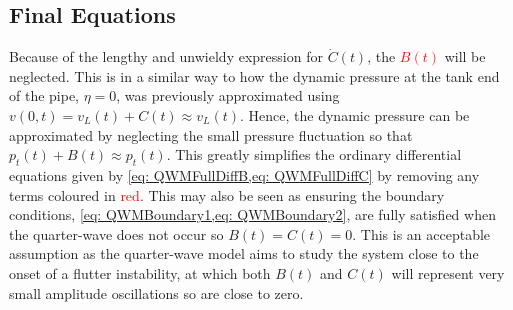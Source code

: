 


%

\subsection{Final Equations} \label{sec: QWMFinalDimensional}


Because of the lengthy and unwieldy expression for $\dot{C}(t)$, the \textcolor{Red}{$B(t)$} will be neglected. This is in a similar way to how the dynamic pressure at the tank end of the pipe, $\eta = 0$, was previously approximated using $v(0,t) = v_L(t) + C(t) \approx v_L(t)$. Hence, the dynamic pressure can be approximated by neglecting the small pressure fluctuation so that $p_t(t) + B(t) \approx p_t(t)$. This greatly simplifies the ordinary differential equations given by \cref{eq: QWMFullDiffB,eq: QWMFullDiffC} by removing any terms coloured in \textcolor{Red}{red}. This may also be seen as ensuring the boundary conditions, \cref{eq: QWMBoundary1,eq: QWMBoundary2}, are fully satisfied when the quarter-wave does not occur so $B(t) = C(t) = 0$. This is an acceptable assumption as the quarter-wave model aims to study the system close to the onset of a flutter instability, at which both $B(t)$ and $C(t)$ will represent very small amplitude oscillations so are close to zero.

